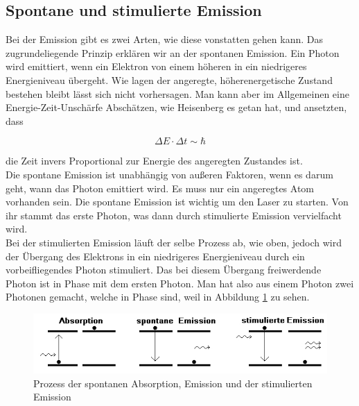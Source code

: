 
\subsection{Spontane und stimulierte Emission}

Bei der Emission gibt es zwei Arten, wie diese vonstatten gehen kann. Das zugrundeliegende Prinzip erklären wir an der spontanen Emission. Ein Photon wird emittiert, wenn ein Elektron 
von einem höheren in ein niedrigeres Energieniveau übergeht. Wie lagen der angeregte, höherenergetische Zustand bestehen bleibt lässt sich nicht vorhersagen. Man kann aber im Allgemeinen 
eine Energie-Zeit-Unschärfe Abschätzen, wie Heisenberg es getan hat, und ansetzten, dass 

\begin{equation*}
    \Delta E \cdot \Delta t \sim  \hbar
\end{equation*}

die Zeit invers Proportional zur Energie des angeregten Zustandes ist.\\
Die spontane Emission ist unabhängig von außeren Faktoren, wenn es darum geht, wann das Photon emittiert wird. Es muss
nur ein angeregtes Atom vorhanden sein. Die spontane Emission ist wichtig um den Laser zu starten. Von ihr stammt das erste Photon, was dann 
durch stimulierte Emission vervielfacht wird.\\
Bei der stimulierten Emission läuft der selbe Prozess ab, wie oben, jedoch wird der Übergang des Elektrons in ein niedrigeres Energieniveau
durch ein vorbeifliegendes Photon stimuliert. Das bei diesem Übergang freiwerdende Photon ist in Phase mit dem ersten Photon. Man hat also aus einem Photon
zwei Photonen gemacht, welche in Phase sind, weil in Abbildung \ref{bild:Emission} zu sehen.

\begin{figure} [ht] 
    \centering
    \includegraphics[width = 13cm]{Bilder/Auswertung/Emission.jpg}
    \caption{Prozess der spontanen Absorption, Emission und der stimulierten Emission\protect \footnotemark}
    \label{bild:Emission}
\end{figure}


